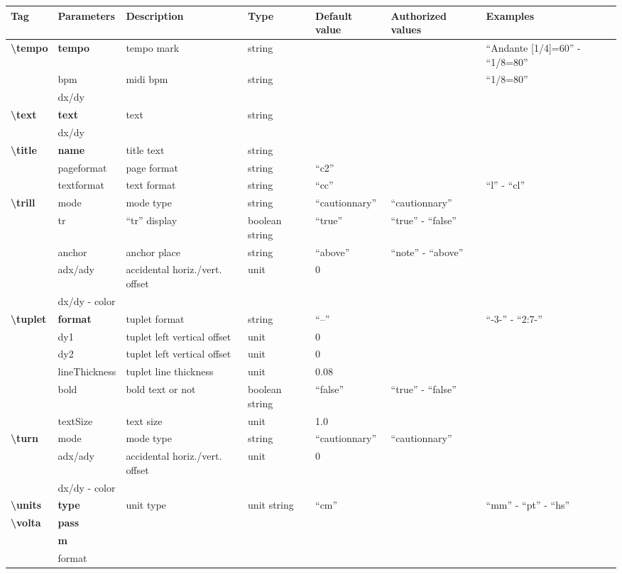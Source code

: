 \documentclass[a4paper, landscape, 10pt]{article}
\begin{document}
\begin{tabularx}{\linewidth}{p{3cm}p{2cm}p{5cm}p{3cm}p{3.5cm}p{3.5cm}p{4cm}}
    \hline
    \textbf{Tag}&\textbf{Parameters}&\textbf{Description}&\textbf{Type}&\textbf{Default value}&\textbf{Authorized values}&\textbf{Examples}\\
    \hline
    \textbf{\textbackslash{}tempo}&\textbf{tempo}&tempo mark&string&&&``Andante [1/4]=60'' - ``1/8=80''\\
    &bpm&midi bpm&string&&&``1/8=80''\\
    &dx/dy&&&&&\\
    \hline
    \textbf{\textbackslash{}text}&\textbf{text}&text&string&&&\\
    &dx/dy&&&&&\\
    \hline
    \textbf{\textbackslash{}title}&\textbf{name}&title text&string&&&\\
    &pageformat&page format&string&``c2''&&\\ %
    &textformat&text format&string&``cc''&&``l'' - ``cl''\\ %
    \hline
    \textbf{\textbackslash{}trill}&mode&mode type&string&``cautionnary''&``cautionnary''&\\
    &tr&``tr'' display&boolean string&``true''&``true'' - ``false''&\\
    &anchor&anchor place&string&``above''&``note'' - ``above''&\\
    &adx/ady&accidental horiz./vert. offset&unit&0&&\\
    &dx/dy - color&&&&&\\
    \hline
    \textbf{\textbackslash{}tuplet}&\textbf{format}&tuplet format&string&``--''&&``-3-'' - ``2:7-''\\
    &dy1&tuplet left vertical offset&unit&0&&\\
    &dy2&tuplet left vertical offset&unit&0&&\\
    &lineThickness&tuplet line thickness&unit&0.08&&\\
    &bold&bold text or not&boolean string&``false''&``true'' - ``false''&\\
    &textSize&text size&unit&1.0&&\\
    \hline
    \textbf{\textbackslash{}turn}&mode&mode type&string&``cautionnary''&``cautionnary''&\\
    &adx/ady&accidental horiz./vert. offset&unit&0&&\\
    &dx/dy - color&&&&&\\
    \hline
    \textbf{\textbackslash{}units}&\textbf{type}&unit type&unit string&``cm''&&``mm'' - ``pt'' - ``hs''\\
    \hline
    \textbf{\textbackslash{}volta}&\textbf{pass}&&&&&\\ %
    &\textbf{m}&&&&&\\
    &format&&&&&\\
    \hline
\end{tabularx}
    
\end{document}
